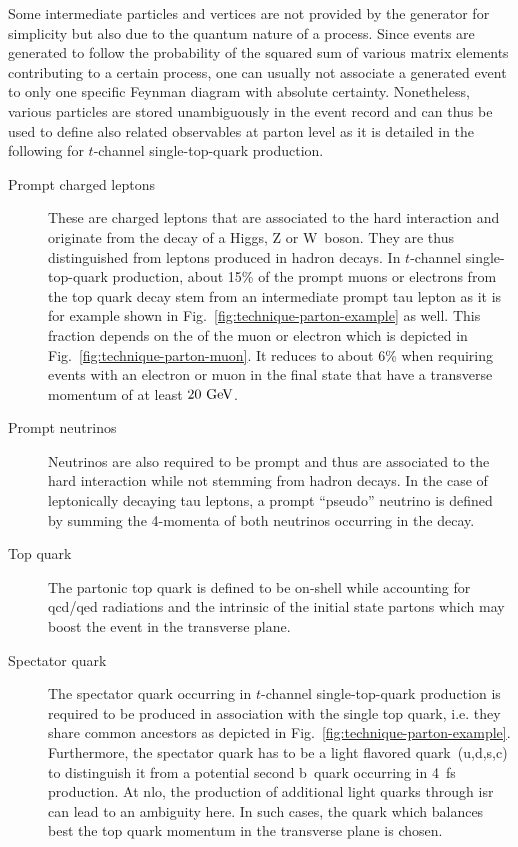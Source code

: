 Some intermediate particles and vertices are not provided by the generator for simplicity but also due to the quantum nature of a process. Since events are generated to follow the probability of the squared sum of various matrix elements contributing to a certain process, one can usually not associate a generated event to only one specific Feynman diagram with absolute certainty. Nonetheless, various particles are  stored unambiguously in the event record and can thus be used to define also related observables at parton level as it is detailed in the following for $t$-channel single-top-quark production.
\begin{description}
\item[Prompt charged leptons] These are charged leptons that are associated to the hard interaction and originate from the decay of a Higgs, Z or W~boson. They are thus distinguished from leptons produced in hadron decays. In $t$-channel single-top-quark production, about 15\% of the prompt muons or electrons from the top quark decay stem from an intermediate prompt tau lepton as it is for example shown in Fig.~\ref{fig:technique-parton-example} as well. This fraction depends on the \pt of the muon or electron which is depicted in Fig.~\ref{fig:technique-parton-muon}. It reduces to about 6\% when requiring events with an electron or muon in the final state that have a transverse momentum of at least $20~\textrm{GeV}$.
\item[Prompt neutrinos] Neutrinos are also required to be prompt and thus are associated to the hard interaction while not stemming from hadron decays. In the case of leptonically decaying tau leptons, a prompt ``pseudo'' neutrino is defined by summing the 4-momenta of both neutrinos occurring in the decay.
\item[Top quark] The partonic top quark is defined to be on-shell while accounting for \gls{qcd}/\gls{qed} radiations and the intrinsic \kt of the initial state partons which may boost the event in the transverse plane.
\item[Spectator quark] The spectator quark occurring in $t$-channel single-top-quark production is required to be produced in association with the single top quark, i.e. they share common ancestors as depicted in Fig.~\ref{fig:technique-parton-example}. Furthermore, the spectator quark has to be a light flavored quark~(u,d,s,c) to distinguish it from a potential second b~quark occurring in 4~\gls{fs} production. At \gls{nlo}, the production of additional light quarks through \gls{isr} can lead to an ambiguity here. In such cases, the quark which balances best the top quark momentum in the transverse plane is chosen.
\end{description}

